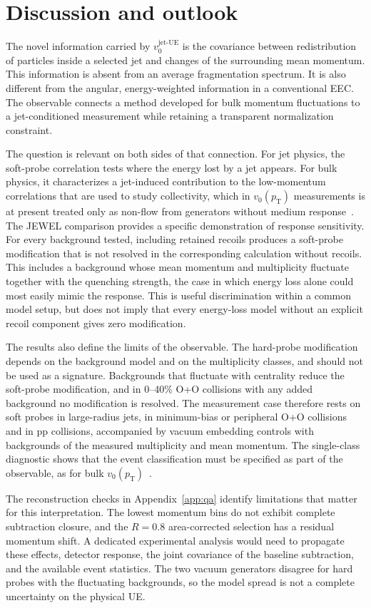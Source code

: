 \documentclass[aps,prc,twocolumn,superscriptaddress,nofootinbib,longbibliography,floatfix,10pt]{revtex4-2}
\newcommand{\pT}{p_{\mathrm T}}
\newcommand{\vjet}{{v_0^{\mathrm{jet\text{-}UE}}}}
\begin{document}
\section{Discussion and outlook}\label{sec:discussion}
The novel information carried by $\vjet$ is the covariance between redistribution of particles inside a selected jet and changes of the surrounding mean momentum. This information is absent from an average fragmentation spectrum. It is also different from the angular, energy-weighted information in a conventional EEC. The observable connects a method developed for bulk momentum fluctuations to a jet-conditioned measurement while retaining a transparent normalization constraint.

The question is relevant on both sides of that connection. For jet physics, the soft-probe correlation tests where the energy lost by a jet appears. For bulk physics, it characterizes a jet-induced contribution to the low-momentum correlations that are used to study collectivity, which in $v_0(\pT)$ measurements is at present treated only as non-flow from generators without medium response~\cite{ATLASv0,ALICEv0}. The JEWEL comparison provides a specific demonstration of response sensitivity. For every background tested, including retained recoils produces a soft-probe modification that is not resolved in the corresponding calculation without recoils. This includes a background whose mean momentum and multiplicity fluctuate together with the quenching strength, the case in which energy loss alone could most easily mimic the response. This is useful discrimination within a common model setup, but does not imply that every energy-loss model without an explicit recoil component gives zero modification.

The results also define the limits of the observable. The hard-probe modification depends on the background model and on the multiplicity classes, and should not be used as a signature. Backgrounds that fluctuate with centrality reduce the soft-probe modification, and in 0--40\% O+O collisions with any added background no modification is resolved. The measurement case therefore rests on soft probes in large-radius jets, in minimum-bias or peripheral O+O collisions and in pp collisions, accompanied by vacuum embedding controls with backgrounds of the measured multiplicity and mean momentum. The single-class diagnostic shows that the event classification must be specified as part of the observable, as for bulk $v_0(\pT)$~\cite{BhattaShape}.

The reconstruction checks in Appendix~\ref{app:qa} identify limitations that matter for this interpretation. The lowest momentum bins do not exhibit complete subtraction closure, and the $R=0.8$ area-corrected selection has a residual momentum shift. A dedicated experimental analysis would need to propagate these effects, detector response, the joint covariance of the baseline subtraction, and the available event statistics. The two vacuum generators disagree for hard probes with the fluctuating backgrounds, so the model spread is not a complete uncertainty on the physical UE.
\end{document}
